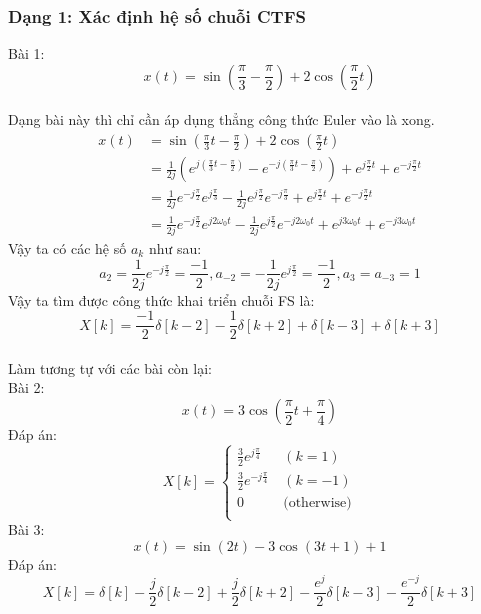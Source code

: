 \documentclass{article}
\begin{document}
\subsubsection{Dạng 1: Xác định hệ số chuỗi CTFS}
Bài 1: $$x(t)=\sin{\left(\frac{\pi}{3}-\frac{\pi}{2}\right)}+2\cos{\left(\frac{\pi}{2}t\right)}$$
\\Dạng bài này thì chỉ cần áp dụng thẳng công thức Euler vào là xong.
\begin{equation*}
    \begin{split}
x(t)&=\sin{\left(\frac{\pi}{3}t-\frac{\pi}{2}\right)}+2\cos{\left(\frac{\pi}{2}t\right)}\\&=\frac{1}{2j}(e^{j(\frac{\pi}{3}t-\frac{\pi}{2})}-e^{-j(\frac{\pi}{3}t-\frac{\pi}{2})})+e^{j\frac{\pi}{2}t}+e^{-j\frac{\pi}{2}t}
 \\ &=\frac{1}{2j}e^{-j\frac{\pi}{2}}e^{j\frac{\pi}{3}}-\frac{1}{2j}e^{j\frac{\pi}{2}}e^{-j\frac{\pi}{3}}+e^{j\frac{\pi}{2}t}+e^{-j\frac{\pi}{2}t}
\\&=\frac{1}{2j}e^{-j\frac{\pi}{2}}e^{j2\omega_{0}t}-\frac{1}{2j}e^{j\frac{\pi}{2}}e^{-j2\omega_{0}t}+e^{j3\omega_{0}t}+e^{-j3\omega_{0}t}
    \end{split}
\end{equation*}
Vậy ta có các hệ số $a_{k}$ như sau:
\begin{equation*}
a_{2}=\frac{1}{2j}e^{-j\frac{\pi}{2}}=\frac{-1}{2}, a_{-2}=-\frac{1}{2j}e^{j\frac{\pi}{2}}=\frac{-1}{2},a_{3}=a_{-3}=1
\end{equation*}
Vậy ta tìm được công thức khai triển chuỗi FS là: $$X[k]=\frac{-1}{2}\delta[k-2]-\frac{1}{2}\delta{[k+2]}+\delta{[k-3]}+\delta{[k+3]}$$
\\ Làm tương tự với các bài còn lại:
\\ Bài 2: 
$$x(t)=3\cos{\left(\frac{\pi}{2}t+\frac{\pi}{4}\right)}$$
Đáp án:
\begin{equation*}
X[k]= \begin{cases}
\frac{3}{2}e^{j\frac{\pi}{4}} &\ (k=1)\\
\frac{3}{2}e^{-j\frac{\pi}{4}} &\ (k=-1)\\
 0 &\ \text{(otherwise)}\\
\end{cases}
\end{equation*}
Bài 3:
$$x(t)=\sin{(2t)}-3\cos{(3t+1)}+1$$
Đáp án:
$$X[k]=\delta[k]-\frac{j}{2}\delta{[k-2]}+\frac{j}{2}\delta{[k+2]}-\frac{e^{j}}{2}\delta{[k-3]}-\frac{e^{-j}}{2}\delta{[k+3]}$$
\end{document}
